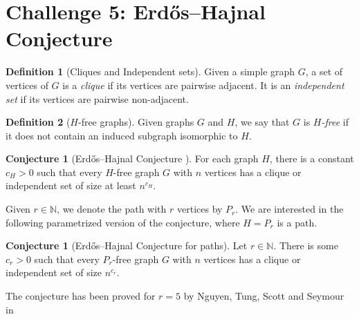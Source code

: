 \documentclass[12pt]{article}
\numberwithin{equation}{section}
\theoremstyle{definition}
\newtheorem{definition}{Definition}
\newtheorem{conjecture}[theorem]{Conjecture}
\begin{document}
\section*{Challenge 5: Erdős--Hajnal Conjecture}


\begin{definition}[Cliques and Independent sets]
Given a simple graph $G$, a set of vertices of $G$ is a \textit{clique} if its vertices are pairwise adjacent. It is an \textit{independent set} if its vertices are pairwise non-adjacent. 
\end{definition}

\begin{definition}[$H$-free graphs]
Given graphs $G$ and $H$, we say that $G$ is \textit{$H$-free} if it does not contain an induced subgraph isomorphic to $H$. 
\end{definition}

\begin{conjecture}[Erdős–Hajnal Conjecture \mbox{\cite{erdos_hajnal}}]
For each graph $H$, there is a constant $c_H > 0$ such that every $H$-free graph $G$ with $n$ vertices has a clique or independent set of size at least $n^{c_H}$. 
\end{conjecture}

Given $r\in \mathbb{N}$, we denote the path with $r$ vertices by $P_r$.
We are interested in the following parametrized version of the conjecture, where $H=P_r$ is a path. 
\begin{conjecture}[Erdős–Hajnal Conjecture for paths]
Let $r\in \mathbb{N}$. There is some $c_r > 0$ such that every $P_r$-free graph $G$ with $n$ vertices has a clique or independent set of size $n^{c_r}$.
\end{conjecture}

The conjecture has been proved for $r=5$ by Nguyen, Tung, Scott and Seymour in \cite{nguyen2026induced}

\printbibliography
\end{document}
